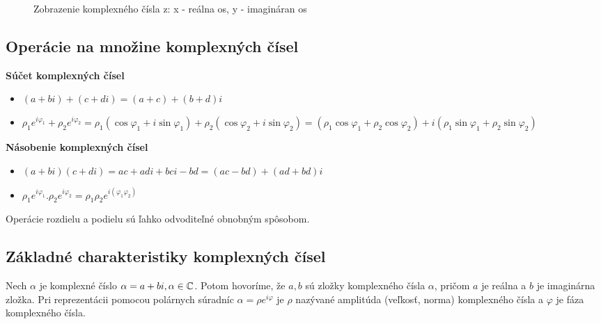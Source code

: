 \begin{figure}
\centering
{}
\caption{Zobrazenie komplexného čísla z: x - reálna os, y - imagináran os}
\label{fig:kn}
\end{figure}

\subsection{Operácie na množine komplexných čísel}
\textbf{Súčet komplexných čísel}
\begin{itemize}
\item \((a + bi) + (c + di) = (a + c) + (b + d)i\)
\item \(\rho_{1}e^{i \varphi_{1}} + \rho_{2}e^{i \varphi_{2}} = \rho_{1}(\cos \varphi_{1} + i\sin \varphi_{1}) + \rho_{2}(\cos \varphi_{2} + i\sin \varphi_{2}) =  (\rho_{1}\cos \varphi_{1} + \rho_{2}\cos \varphi_{2}) + i(\rho_{1}\sin \varphi_{1} + \rho_{2}\sin \varphi_{2})\)
\end{itemize}

\textbf{Násobenie komplexných čísel}
\begin{itemize}
\item \((a + bi)(c + di) = ac + adi + bci - bd = (ac - bd) + (ad + bd)i\)
\item \(\rho_{1}e^{i \varphi_{1}} . \rho_{2}e^{i \varphi_{2}} = \rho_{1} \rho_{2}e^{i(\varphi_{1} \varphi_{2})}\)
\end{itemize}

Operácie rozdielu a podielu sú ľahko odvoditeľné obnobným spôsobom.

\subsection{Základné charakteristiky komplexných čísel}
Nech \(\alpha\) je komplexné číslo \(\alpha = a + bi, \alpha \in \mathbb{C}\).
Potom hovoríme, že \(a,b\) sú zložky komplexného čísla \(\alpha\), pričom \(a\) je reálna a \(b\) je imaginárna zložka.
Pri reprezentácii pomocou polárnych súradníc \(\alpha = \rho e^{i\varphi}\) je \(\rho\) nazývané amplitúda (veľkosť, norma) komplexného čísla a \(\varphi\) je fáza komplexného čísla. \\

